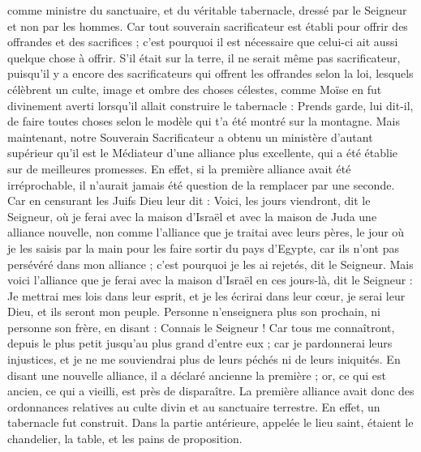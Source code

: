 \begin{multicols}{2}
comme ministre du sanctuaire, et du véritable tabernacle, dressé par le Seigneur et non par les hommes.
Car tout souverain sacrificateur est établi pour offrir des offrandes et des sacrifices ; c'est pourquoi il est nécessaire que celui-ci ait aussi quelque chose à offrir.
S’il était sur la terre, il ne serait même pas sacrificateur, puisqu’il y a encore des sacrificateurs qui offrent les offrandes selon la loi,
lesquels célèbrent un culte, image et ombre des choses célestes, comme Moïse en fut divinement averti lorsqu’il allait construire le tabernacle : Prends garde, lui dit-il, de faire toutes choses selon le modèle qui t'a été montré sur la montagne.
Mais maintenant, notre Souverain Sacrificateur a obtenu un ministère d'autant supérieur qu'il est le Médiateur d'une alliance plus excellente, qui a été établie sur de meilleures promesses.
En effet, si la première alliance avait été irréprochable, il n’aurait jamais été question de la remplacer par une seconde.
Car en censurant les Juifs Dieu leur dit : Voici, les jours viendront, dit le Seigneur, où je ferai avec la maison d'Israël et avec la maison de Juda une alliance nouvelle,
non comme l'alliance que je traitai avec leurs pères, le jour où je les saisis par la main pour les faire sortir du pays d'Egypte, car ils n'ont pas persévéré dans mon alliance ; c'est pourquoi je les ai rejetés, dit le Seigneur.
Mais voici l'alliance que je ferai avec la maison d'Israël en ces jours-là, dit le Seigneur : Je mettrai mes lois dans leur esprit, et je les écrirai dans leur cœur, je serai leur Dieu, et ils seront mon peuple.
Personne n'enseignera plus son prochain, ni personne son frère, en disant : Connais le Seigneur ! Car tous me connaîtront, depuis le plus petit jusqu'au plus grand d'entre eux ;
car je pardonnerai leurs injustices, et je ne me souviendrai plus de leurs péchés ni de leurs iniquités.
En disant une nouvelle alliance, il a déclaré ancienne la première ; or, ce qui est ancien, ce qui a vieilli, est près de disparaître.
\VerseOne{}La première alliance avait donc des ordonnances relatives au culte divin et au sanctuaire terrestre.
En effet, un tabernacle fut construit. Dans la partie antérieure, appelée le lieu saint, étaient le chandelier, la table, et les pains de proposition.

\end{multicols}
